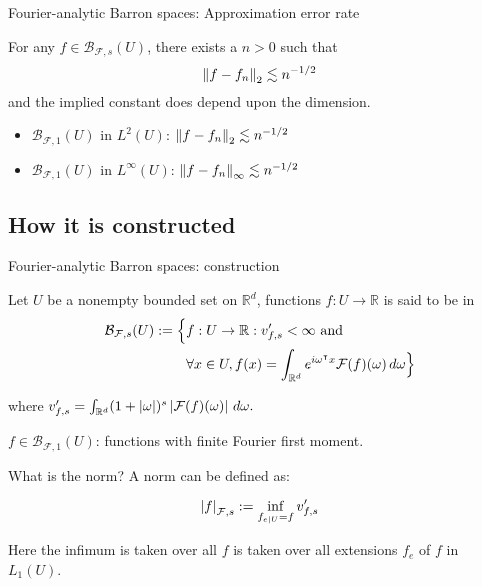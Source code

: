 \documentclass[aspectratio=32]{beamer}
\begin{document}
\begin{frame}{Fourier-analytic Barron spaces: Approximation error rate}

    \begin{theorem}[Barron 1993]
        For any $f \in \mathcal{B}_{\mathcal{F},s}(U)$, there exists a $n > 0$
        such that
        \begin{equation}
            \left\| f - f_n \right\|_2 \lesssim n^{-1/2}
        \end{equation}
        and the implied constant does depend upon the dimension.
    \end{theorem}

    \begin{itemize}
        \item $\mathcal{B}_{\mathcal{F},1}(U)$ in $L^{2}(U)$: $\left\| f - f_n \right\|_2
                  \lesssim n^{-1/2}$
        \item $\mathcal{B}_{\mathcal{F},1}(U)$ in $L^{\infty}(U)$: $\left\| f -
                      f_n \right\|_{\infty} \lesssim n^{-1/2}$
    \end{itemize}

\end{frame}

\subsection{How it is constructed}

\begin{frame}{Fourier-analytic Barron spaces: construction}

    Let $U$ be a nonempty bounded set on $\mathbb{R}^d$, functions $f: U \to
        \mathbb{R}$ is said to be in
    \begin{align*}
        \mathcal{B}_{\mathcal{F},s}(U) := \Big\{
         & f: U \to \mathbb{R}: v'_{f,s} < \infty  \textnormal{ and } \\
         & \forall x\in U,
        f(x) = \int_{\mathbb{R}^d} e^{i\omega{}^{\intercal} x} \mathcal{F}(f)(\omega)\,d\omega
        \Big\}
    \end{align*}

    where $v'_{f,s} = \int_{\mathbb{R}^d} (1 + \left| \omega \right|)^s
        \left| \mathcal{F}(f)(\omega) \right| \,d\omega.$

    $f \in \mathcal{B}_{\mathcal{F},1}(U)$: functions with finite Fourier first
    moment.
\end{frame}

\begin{frame}{What is the norm?}
    A norm can be defined as:

    \begin{definition}
        \begin{equation}
            \left| f \right|_{\mathcal{F}, s} := \inf_{f_{e \mid U} = f} v'_{f, s}
        \end{equation}
    \end{definition}

    Here the infimum is taken over all $f$ is taken over all extensions $f_e$ of $f$ in $L_1(U)$.
\end{frame}
\end{document}
